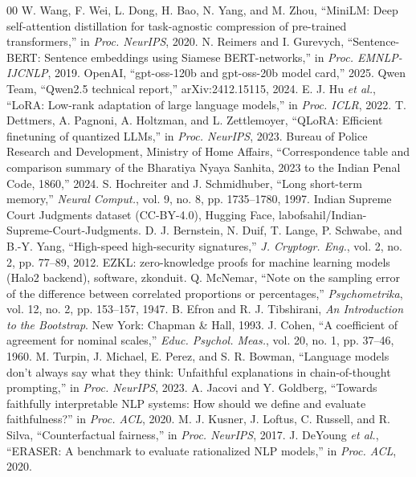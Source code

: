 \documentclass[conference]{IEEEtran}
\begin{document}
\begin{thebibliography}{00}
 W. Wang, F. Wei, L. Dong, H. Bao, N. Yang, and M. Zhou, ``MiniLM: Deep self-attention distillation for task-agnostic compression of pre-trained transformers,'' in \textit{Proc. NeurIPS}, 2020.
 N. Reimers and I. Gurevych, ``Sentence-BERT: Sentence embeddings using Siamese BERT-networks,'' in \textit{Proc. EMNLP-IJCNLP}, 2019.
 OpenAI, ``gpt-oss-120b and gpt-oss-20b model card,'' 2025.
 Qwen Team, ``Qwen2.5 technical report,'' arXiv:2412.15115, 2024.
 E. J. Hu \textit{et al.}, ``LoRA: Low-rank adaptation of large language models,'' in \textit{Proc. ICLR}, 2022.
 T. Dettmers, A. Pagnoni, A. Holtzman, and L. Zettlemoyer, ``QLoRA: Efficient finetuning of quantized LLMs,'' in \textit{Proc. NeurIPS}, 2023.
 Bureau of Police Research and Development, Ministry of Home Affairs, ``Correspondence table and comparison summary of the Bharatiya Nyaya Sanhita, 2023 to the Indian Penal Code, 1860,'' 2024.
 S. Hochreiter and J. Schmidhuber, ``Long short-term memory,'' \textit{Neural Comput.}, vol. 9, no. 8, pp. 1735--1780, 1997.
 Indian Supreme Court Judgments dataset (CC-BY-4.0), Hugging Face, labofsahil/Indian-Supreme-Court-Judgments.
 D. J. Bernstein, N. Duif, T. Lange, P. Schwabe, and B.-Y. Yang, ``High-speed high-security signatures,'' \textit{J. Cryptogr. Eng.}, vol. 2, no. 2, pp. 77--89, 2012.
 EZKL: zero-knowledge proofs for machine learning models (Halo2 backend), software, zkonduit.
 Q. McNemar, ``Note on the sampling error of the difference between correlated proportions or percentages,'' \textit{Psychometrika}, vol. 12, no. 2, pp. 153--157, 1947.
 B. Efron and R. J. Tibshirani, \textit{An Introduction to the Bootstrap}. New York: Chapman \& Hall, 1993.
 J. Cohen, ``A coefficient of agreement for nominal scales,'' \textit{Educ. Psychol. Meas.}, vol. 20, no. 1, pp. 37--46, 1960.
 M. Turpin, J. Michael, E. Perez, and S. R. Bowman, ``Language models don't always say what they think: Unfaithful explanations in chain-of-thought prompting,'' in \textit{Proc. NeurIPS}, 2023.
 A. Jacovi and Y. Goldberg, ``Towards faithfully interpretable NLP systems: How should we define and evaluate faithfulness?'' in \textit{Proc. ACL}, 2020.
 M. J. Kusner, J. Loftus, C. Russell, and R. Silva, ``Counterfactual fairness,'' in \textit{Proc. NeurIPS}, 2017.
 J. DeYoung \textit{et al.}, ``ERASER: A benchmark to evaluate rationalized NLP models,'' in \textit{Proc. ACL}, 2020.
\end{thebibliography}
\end{document}
